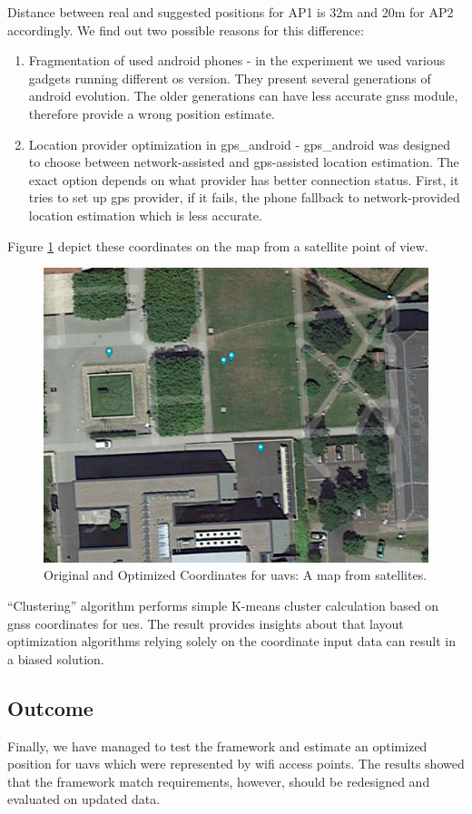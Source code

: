 Distance between real and suggested positions for AP1 is 32m and 20m for AP2 accordingly. We find out two possible reasons for this difference:

\begin{enumerate}
	\item Fragmentation of used \gls{android} phones - in the experiment we used various gadgets running different \gls{os} version. They present several generations of \gls{android} evolution. The older generations can have less accurate \gls{gnss} module, therefore provide a wrong position estimate.
	\item Location provider optimization in \gls{gps_android} - \gls{gps_android} was designed  to choose between network-assisted and \acrshort{gps}-assisted location estimation. The exact option depends on what provider has better connection status. First, it tries to set up \acrshort{gps} provider, if it fails, the phone fallback to network-provided location estimation which is less accurate.
\end{enumerate}


Figure \ref{fig:optimized-coordinates-satellite-map} depict these coordinates on the map from a satellite point of view.

\begin{figure}[H]
	\centering
	\includegraphics[width=0.5\linewidth,keepaspectratio]{images/Expt4_Result_of_optimization_sattelite.png}
	\caption{Original and Optimized Coordinates for \glspl{uav}: A map from satellites.}
	\label{fig:optimized-coordinates-satellite-map}
\end{figure}

``Clustering'' algorithm performs simple K-means cluster calculation
based on \gls{gnss} coordinates for \glspl{ue}. The result provides insights about that layout optimization algorithms relying solely on the coordinate input data can result in a biased solution.

\subsection{Outcome}

Finally, we have managed to test the framework and estimate an optimized position for \glspl{uav} which were represented by \gls{wifi} access points. The results showed that the framework match requirements, however, should be redesigned and evaluated on updated data.
